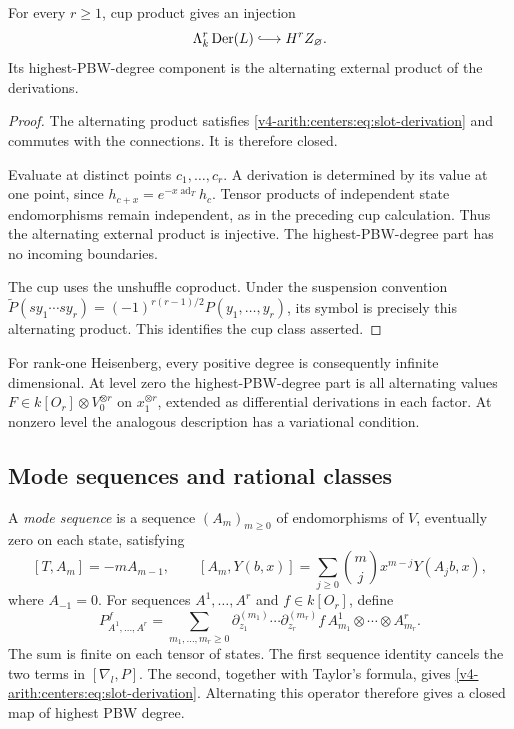 \begin{proposition}\label{v4-arith:centers:prop:all-exterior}
For every $r\geq1$,
cup product gives an
injection
\[
 \Lambda^r_k\operatorname{Der}(L)
 \lhook\joinrel\longrightarrow H^rZ_\varnothing.
\]
Its highest-PBW-degree
component is the
alternating external
product of the
derivations.
\end{proposition}

\begin{proof}
The alternating product
satisfies
\eqref{v4-arith:centers:eq:slot-derivation}
and commutes with the
connections. It is
therefore closed.

Evaluate at distinct
points $c_1,\ldots,c_r$.
A derivation is determined
by its value at one
point, since
$h_{c+x}=e^{-x\operatorname{ad}_T}h_c$.
Tensor products of
independent state
endomorphisms remain
independent, as in
the preceding cup
calculation. Thus
the alternating
external product
is injective.
The highest-PBW-degree
part has no incoming
boundaries.

The cup uses the
unshuffle coproduct.
Under the suspension
convention
$\widetilde P(sy_1\cdots sy_r)
=(-1)^{r(r-1)/2}P(y_1,\ldots,y_r)$,
its symbol is precisely
this alternating
product. This
identifies the cup
class asserted.
\end{proof}

For rank-one Heisenberg,
every positive degree
is consequently infinite
dimensional. At level
zero the highest-PBW-degree
part is all alternating
values
$F\in k[O_r]\otimes V_0^{\otimes r}$
on $x_1^{\otimes r}$,
extended as differential
derivations in each
factor. At nonzero
level the analogous
description has a
variational condition.

\subsection{Mode sequences and rational classes}
\label{v4-arith:centers:subsec:mode-sequences}

A \emph{mode sequence}
is a sequence $(A_m)_{m\geq0}$
of endomorphisms of $V$,
eventually zero on each
state, satisfying
\[
 [T,A_m]=-mA_{m-1},\qquad
 [A_m,Y(b,x)]
 =\sum_{j\geq0}\binom mjx^{m-j}Y(A_jb,x),
\]
where $A_{-1}=0$.
For sequences $A^1,\ldots,A^r$
and $f\in k[O_r]$, define
\begin{equation}\label{v4-arith:centers:eq:multi-mode}
 P^f_{A^1,\ldots,A^r}
 =
 \sum_{m_1,\ldots,m_r\geq0}
 \partial_{z_1}^{(m_1)}\cdots
 \partial_{z_r}^{(m_r)}f\,
 A^1_{m_1}\otimes\cdots\otimes A^r_{m_r}.
\end{equation}
The sum is finite on
each tensor of states.
The first sequence
identity cancels the
two terms in
$[\nabla_l,P]$.
The second, together
with Taylor's formula,
gives
\eqref{v4-arith:centers:eq:slot-derivation}.
Alternating this operator
therefore gives a closed
map of highest PBW
degree.


